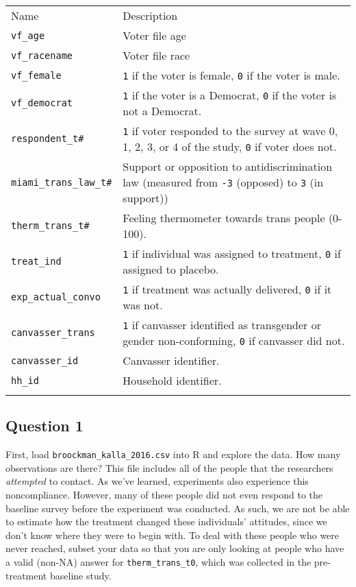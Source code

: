 \documentclass[]{article}
\begin{document}
\begin{longtable}[c]{@{}ll@{}}
\toprule\addlinespace
Name & Description
\\\addlinespace
\midrule\endhead
\texttt{vf\_age} & Voter file age
\\\addlinespace
\texttt{vf\_racename} & Voter file race
\\\addlinespace
\texttt{vf\_female} & \texttt{1} if the voter is female, \texttt{0} if
the voter is male.
\\\addlinespace
\texttt{vf\_democrat} & \texttt{1} if the voter is a Democrat,
\texttt{0} if the voter is not a Democrat.
\\\addlinespace
\texttt{respondent\_t\#} & \texttt{1} if voter responded to the survey
at wave 0, 1, 2, 3, or 4 of the study, \texttt{0} if voter does not.
\\\addlinespace
\texttt{miami\_trans\_law\_t\#} & Support or opposition to
antidiscrimination law (measured from \texttt{-3} (opposed) to
\texttt{3} (in support))
\\\addlinespace
\texttt{therm\_trans\_t\#} & Feeling thermometer towards trans people
(0-100).
\\\addlinespace
\texttt{treat\_ind} & \texttt{1} if individual was assigned to
treatment, \texttt{0} if assigned to placebo.
\\\addlinespace
\texttt{exp\_actual\_convo} & \texttt{1} if treatment was actually
delivered, \texttt{0} if it was not.
\\\addlinespace
\texttt{canvasser\_trans} & \texttt{1} if canvasser identified as
transgender or gender non-conforming, \texttt{0} if canvasser did not.
\\\addlinespace
\texttt{canvasser\_id} & Canvasser identifier.
\\\addlinespace
\texttt{hh\_id} & Household identifier.
\\\addlinespace
\bottomrule
\end{longtable}

\subsection{Question 1}\label{question-1}

First, load \texttt{broockman\_kalla\_2016.csv} into R and explore the
data. How many observations are there? This file includes all of the
people that the researchers \emph{attempted} to contact. As we've
learned, experiments also experience this noncompliance. However, many
of these people did not even respond to the baseline survey before the
experiment was conducted. As such, we are not be able to estimate how
the treatment changed these individuals' attitudes, since we don't know
where they were to begin with. To deal with these people who were never
reached, subset your data so that you are only looking at people who
have a valid (non-NA) answer for \texttt{therm\_trans\_t0}, which was
collected in the pre-treatment baseline study.
\end{document}

